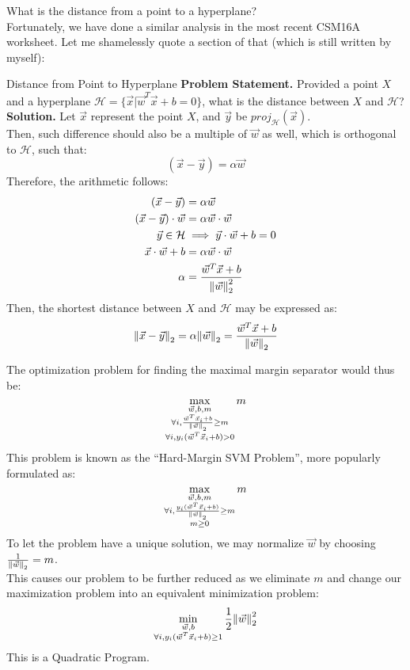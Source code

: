 What is the distance from a point to a hyperplane? \\
Fortunately, we have done a similar analysis in the most recent CSM16A worksheet. Let me shamelessly quote a section of that (which is still written by myself):
\begin{ln-explain}{Distance from Point to Hyperplane}{}
    \textbf{Problem Statement.} Provided a point $X$ and a hyperplane $\mathcal{H} = \{\vec{x} \big| \vec{w}^T \vec{x} + b = 0\}$, what is the distance between $X$ and $\mathcal{H}$?
    \tcblower
    \textbf{Solution.}    
    Let $\vec{x}$ represent the point $X$, and $\vec{y}$ be ${proj}_{\mathcal{H}}(\vec{x})$. \\
    Then, such difference should also be a multiple of $\vec{w}$ as well, which is orthogonal to $\mathcal{H}$, such that:
    \[
        (\vec{x} - \vec{y}) = \alpha \vec{w}
    \]
    Therefore, the arithmetic follows:
    \begin{align*}
        (\vec{x} - \vec{y}) &= \alpha \vec{w} \\
        (\vec{x} - \vec{y}) \cdot \vec{w} &= \alpha \vec{w} \cdot \vec{w} \\
        \vec{y} \in \mathcal{H} &\implies \vec{y} \cdot \vec{w} + b = 0 \\
        \vec{x} \cdot \vec{w} + b &= \alpha \vec{w} \cdot \vec{w} \\
        \alpha &= \frac{\vec{w}^T \vec{x} + b}{\pnorm[2]{\vec{w}}{2}}
    \end{align*}
    Then, the shortest distance between $X$ and $\mathcal{H}$ may be expressed as:
    \[
        \pnorm{\vec{x} - \vec{y}}{2} = \alpha \pnorm{\vec{w}}{2} = \frac{\vec{w}^T \vec{x} + b}{\pnorm{\vec{w}}{2}}
    \]
\end{ln-explain}

The optimization problem for finding the maximal margin separator would thus be:
\[
    \max_{
        \substack{
            \vec{w}, b, m \\
            \forall i, \frac{\vec{w}^T \vec{x}_i + b}{\pnorm{\vec{w}}{2}} \geq m \\
            \forall i, y_i (\vec{w}^T \vec{x}_i + b) > 0
        }
    }
    m
\]
This problem is known as the ``Hard-Margin SVM Problem'', more popularly formulated as:
\[
    \max_{
        \substack{
            \vec{w}, b, m \\
            \forall i, \frac{y_i (\vec{w}^T \vec{x}_i + b)}{\pnorm{\vec{w}}{2}} \geq m \\
            m \geq 0
        }
    }
    m
\]
To let the problem have a unique solution, we may normalize $\vec{w}$ by choosing $\frac{1}{\pnorm{\vec{w}}{2}} = m$. \\
This causes our problem to be further reduced as we eliminate $m$ and change our maximization problem into an equivalent minimization problem:
\[
    \min_{
        \substack{
            \vec{w}, b \\
            \forall i, y_i (\vec{w}^T \vec{x}_i + b) \geq 1
        }
    }
    \frac{1}{2} \pnorm[2]{\vec{w}}{2}
\]
This is a Quadratic Program.

